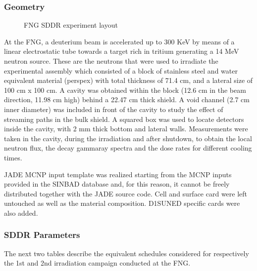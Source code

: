\documentclass[letterpaper,10pt,english]{sphinxmanual}
\let\sphinxpxdimen\pdfpxdimen\else\newdimen\sphinxpxdimen
\begin{document}
\subsubsection{Geometry}
\label{\detokenize{usage/benchmarks:geometry}}
\begin{figure}[htbp]
\centering
\capstart

\noindent\sphinxincludegraphics[width=600\sphinxpxdimen]{{fng}.jpg}
\caption{FNG SDDR experiment layout}\label{\detokenize{usage/benchmarks:id32}}\end{figure}

\sphinxAtStartPar
At the FNG, a deuterium beam is accelerated up to 300 KeV by means of a linear electro\sphinxhyphen{}static
tube towards a target rich in tritium generating a 14 MeV neutron source. These are the
neutrons that were used to irradiate the experimental assembly which consisted of a block of
stainless steel and water equivalent material (perspex) with total thickness of 71.4 cm, and
a lateral size of 100 cm x 100 cm. A cavity was obtained within the block (12.6 cm in the beam
direction, 11.98 cm high) behind a 22.47 cm thick shield. A void channel (2.7 cm inner diameter)
was included in front of the cavity to study the effect of streaming paths in the bulk shield.
A squared box was used to locate detectors inside the cavity, with 2 mm thick bottom and lateral walls.
Measurements were taken in the cavity, during the irradiation and after shut\sphinxhyphen{}down, to obtain the
local neutron flux, the decay gamma\sphinxhyphen{}ray spectra and the dose rates for different cooling times.

\sphinxAtStartPar
JADE MCNP input template was realized starting from the MCNP inputs provided in the SINBAD database
and, for this reason, it cannot be freely distributed together with the JADE source code.
Cell and surface card were left untouched as well as the material composition. D1S\sphinxhyphen{}UNED specific
cards were also added.


\subsubsection{SDDR Parameters}
\label{\detokenize{usage/benchmarks:id14}}
\sphinxAtStartPar
The next two tables describe the equivalent schedules considered for respectively the 1st and 2nd
irradiation campaign conducted at the FNG.
\end{document}
